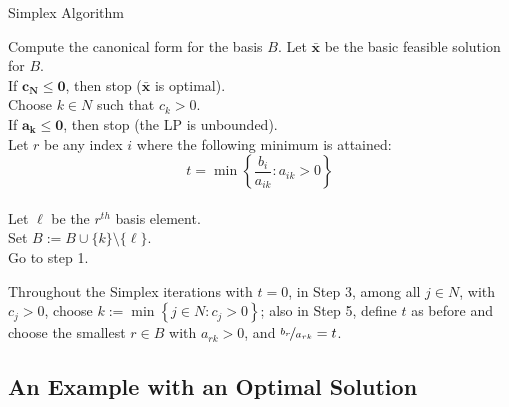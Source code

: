 \begin{algbox}
    \begin{algorithm}[H]
        \caption{Simplex Algorithm}
        Compute the canonical form for the basis $B$. Let $\bm{\bar{x}}$
        be the basic feasible solution for $ B $.\\
        If $\bm{c_N}\leqslant \bm{0}$, then stop ($\bm{\bar{x}}$ is optimal).\\
        Choose $k\in N$ such that $c_k>0$.\\
        If $\bm{a_k}\leqslant \bm{0}$, then stop (the LP is unbounded).\\
        Let $r$ be any index $ i $ where the following minimum is attained:
        \[t=\min\left\{\frac{b_i}{a_{ik}} : a_{ik}>0\right\}\]\\
        Let $\ell$ be the $r^{th}$ basis element.\\
        Set $B:=B\cup\{k\}\setminus\{\ell\}$.\\
        Go to step 1.
    \end{algorithm}
\end{algbox}

\begin{thmbox}
    \begin{theorem}
        Throughout the Simplex iterations with $ t=0 $, in Step 3, among
        all $ j\in N $, with $ c_j>0 $, choose $ k:=\min\left\{ j\in N:c_j>0\right\} $;
        also in Step 5, define $ t $ as before and choose the smallest
        $ r\in B $ with $ a_{rk}>0 $, and $ \nicefrac{b_r}{a_{rk}}=t $.
    \end{theorem}
\end{thmbox}

\subsection{An Example with an Optimal Solution}

